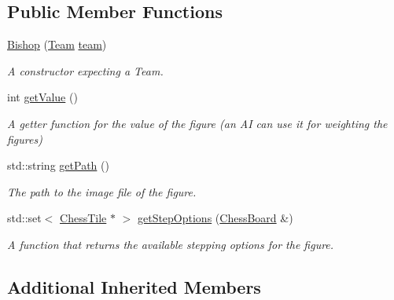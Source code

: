 \subsection*{Public Member Functions}
\begin{DoxyCompactItemize}
\item 
\mbox{\label{classBishop_a8e41c7d03936f10f1d7f78bb9b3a8b34}} 
\mbox{\hyperlink{classBishop_a8e41c7d03936f10f1d7f78bb9b3a8b34}{Bishop}} (\mbox{\hyperlink{classChessFigure_a62f54318c1f28a08e6a6a2707f697a1d}{Team}} \mbox{\hyperlink{classChessFigure_ac7d0751a28c94d49927b9524390d1261}{team}})
\begin{DoxyCompactList}\small\item\em A constructor expecting a Team. \end{DoxyCompactList}\item 
\mbox{\label{classBishop_a7255af36858df3d5349a9ab815afa9a7}} 
int \mbox{\hyperlink{classBishop_a7255af36858df3d5349a9ab815afa9a7}{get\+Value}} ()
\begin{DoxyCompactList}\small\item\em A getter function for the value of the figure (an AI can use it for weighting the figures) \end{DoxyCompactList}\item 
\mbox{\label{classBishop_af2345c750c316768d046b064e6328b40}} 
std\+::string \mbox{\hyperlink{classBishop_af2345c750c316768d046b064e6328b40}{get\+Path}} ()
\begin{DoxyCompactList}\small\item\em The path to the image file of the figure. \end{DoxyCompactList}\item 
std\+::set$<$ \mbox{\hyperlink{classChessTile}{Chess\+Tile}} $\ast$ $>$ \mbox{\hyperlink{classBishop_a5da898db86a3025a5064d2d6ea2f1148}{get\+Step\+Options}} (\mbox{\hyperlink{classChessBoard}{Chess\+Board}} \&)
\begin{DoxyCompactList}\small\item\em A function that returns the available stepping options for the figure. \end{DoxyCompactList}\end{DoxyCompactItemize}
\subsection*{Additional Inherited Members}


